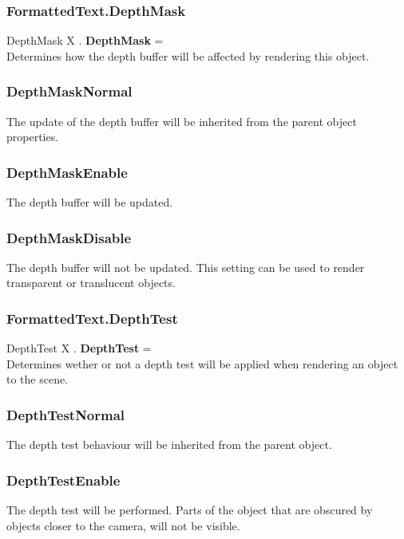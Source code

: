 \documentclass[10pt]{book}
\begin{document}
\subsubsection{FormattedText.DepthMask \label{F:FormattedText:DepthMask}}
DepthMask X . \textbf{DepthMask} = \\
Determines how the depth buffer will be affected by rendering this object.

\subsubsection{DepthMaskNormal \label{T:DepthMask|DepthMaskNormal}}
The update of the depth buffer will be inherited from the parent object properties.

\subsubsection{DepthMaskEnable \label{T:DepthMask|DepthMaskEnable}}
The depth buffer will be updated.

\subsubsection{DepthMaskDisable \label{T:DepthMask|DepthMaskDisable}}
The depth buffer will not be updated. This setting can be used to render transparent or translucent objects.

\subsubsection{FormattedText.DepthTest \label{F:FormattedText:DepthTest}}
DepthTest X . \textbf{DepthTest} = \\
Determines wether or not a depth test will be applied when rendering an object to the scene.

\subsubsection{DepthTestNormal \label{T:DepthTest|DepthTestNormal}}
The depth test behaviour will be inherited from the parent object.

\subsubsection{DepthTestEnable \label{T:DepthTest|DepthTestEnable}}
The depth test will be performed. Parts of the object that are obscured by objects closer to the camera, will not be visible.
\end{document}
